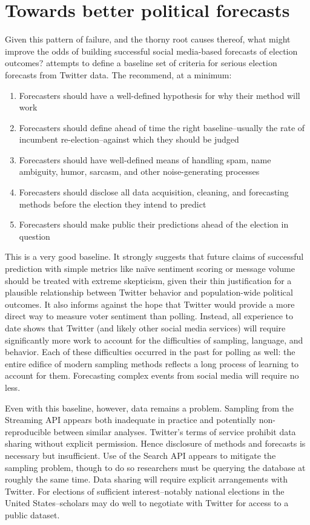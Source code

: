 \documentclass{article}
\begin{document}
\section{Towards better political forecasts}
\label{sec:towards-bett-polit}

Given this pattern of failure, and the thorny root causes thereof,
what might improve the odds of building successful social media-based
forecasts of election outcomes? \cite{gayo2012wanted} attempts to
define a baseline set of criteria for serious election forecasts from
Twitter data. The recommend, at a minimum:

\begin{enumerate}
\item Forecasters should have a well-defined hypothesis for why their
  method will work
\item Forecasters should define ahead of time the right
  baseline--usually the rate of incumbent re-election--against which
  they should be judged
\item Forecasters should have well-defined means of handling spam,
  name ambiguity, humor, sarcasm, and other noise-generating processes
\item Forecasters should disclose all data acquisition, cleaning, and
  forecasting methods before the election they intend to predict
\item Forecasters should make public their predictions ahead of the election in question
\end{enumerate}

This is a very good baseline. It strongly suggests that future claims
of successful prediction with simple metrics like na\"ive sentiment
scoring or message volume should be treated with extreme skepticism,
given their thin justification for a plausible relationship between
Twitter behavior and population-wide political outcomes. It also
informs against the hope that Twitter would provide a more direct way
to measure voter sentiment than polling. Instead, all experience to
date shows that Twitter (and likely other social media services) will
require significantly more work to account for the difficulties of
sampling, language, and behavior. Each of these difficulties occurred
in the past for polling as well: the entire edifice of modern sampling
methods reflects a long process of learning to account for
them. Forecasting complex events from social media will require no
less.
 
Even with this baseline, however, data remains a problem. Sampling
from the Streaming API appears both inadequate in practice and
potentially non-reproducible between similar analyses. Twitter's terms
of service prohibit data sharing without explicit permission. Hence
disclosure of methods and forecasts is necessary but insufficient. Use
of the Search API appears to mitigate the sampling problem, though to
do so researchers must be querying the database at roughly the same
time. Data sharing will require explicit arrangements with
Twitter. For elections of sufficient interest--notably national
elections in the United States--scholars may do well to negotiate with
Twitter for access to a public dataset.
\end{document}
